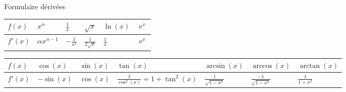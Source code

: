 \documentclass[serif,mathserif, 10pt]{beamer}
\theoremstyle{break}
\DeclareMathOperator{\e}{e} %
\begin{document}
\begin{frame}{Formulaire dérivées}
  \begin{center}
  \renewcommand{\arraystretch}{3} %
  \begin{tabular}{|l|C{1cm}|C{1cm}|C{1cm}|C{1cm}|C{1cm}|}
    \hline
    $f(x)$ & $x^{\alpha}$ & $\frac{1}{x}$ & $\sqrt{x}$ & $\ln(x)$ & $\e^x$\\
    \hline
    $f'(x)$ & $\alpha x^{\alpha-1}$ & $-\frac{1}{x^2}$ & $\frac{1}{2\sqrt{x}}$ 
            & $\frac{1}{x}$ & $\e^x$\\
    \hline
  \end{tabular}
\end{center}

\tiny
\begin{center}
  \renewcommand{\arraystretch}{2} %
  \begin{tabular}{|l|C{1cm}|C{1cm}|C{2.5cm}|C{1cm}|C{1cm}|C{1cm}|}
    \hline
    $f(x)$ & $\cos(x)$ & $\sin(x)$ & $\tan(x)$ & $\arcsin(x)$ & $\arccos(x)$ & $\arctan(x)$\\
    \hline
    $f'(x)$ & $-\sin(x)$ & $\cos(x)$ & $\frac{1}{\cos^2(x)}=1+\tan^2(x)$ 
            & $\frac{1}{\sqrt{1-x^2}}$ & $\frac{-1}{\sqrt{1-x^2}}$ & $\frac{1}{1+x^2}$\\
    \hline
  \end{tabular}
\end{center}  
\end{frame}
\end{document}
